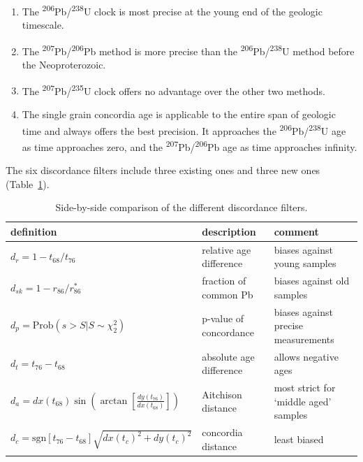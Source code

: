\documentclass{article}
\begin{document}
\begin{enumerate}
  \item The \textsuperscript{206}Pb/\textsuperscript{238}U clock is
    most precise at the young end of the geologic timescale.
  \item The \textsuperscript{207}Pb/\textsuperscript{206}Pb method is
    more precise than the
    \textsuperscript{206}Pb/\textsuperscript{238}U method before the
    Neoproterozoic.
  \item The \textsuperscript{207}Pb/\textsuperscript{235}U clock
    offers no advantage over the other two methods.
  \item The single grain concordia age is applicable to the entire
    span of geologic time and always offers the best precision. It
    approaches the \textsuperscript{206}Pb/\textsuperscript{238}U age
    as time approaches zero, and the
    \textsuperscript{207}Pb/\textsuperscript{206}Pb age as time
    approaches infinity.
\end{enumerate}

\noindent The six discordance filters include three existing ones and
three new ones (Table~\ref{tab:summary}).

\begin{table}
  \begin{tabular}{lll}
    definition & description & comment \\ \hline
    $d_{r} = 1 - t_{68}/t_{76}$ &
    relative age difference &
    biases against young samples \\
    $d_{sk} = 1 - r_{86}/r_{86}^\ast$ & fraction of common Pb &
    biases against old samples \\
    $d_p = \mbox{Prob}\left(s > S | S \sim \chi^2_2\right)$ &
    p-value of concordance &
    biases against precise measurements \\
    $d_{t} = t_{76} - t_{68}$ & absolute age difference &  allows negative ages \\
    $d_{a} = dx(t_{68}) \sin\!\left(\arctan\!\left[
      \frac{dy(t_{76})}{dx(t_{68})} \right] \right)$ & Aitchison distance &
    most strict for `middle aged' samples \\
    $d_c = \mbox{sgn}[t_{76}-t_{68}] \sqrt{ dx(t_c)^2 + dy(t_c)^2 }$ &
    concordia distance & least biased
  \end{tabular}
  \caption{Side-by-side comparison of the different discordance filters.}
  \label{tab:summary}
\end{table}
\end{document}

